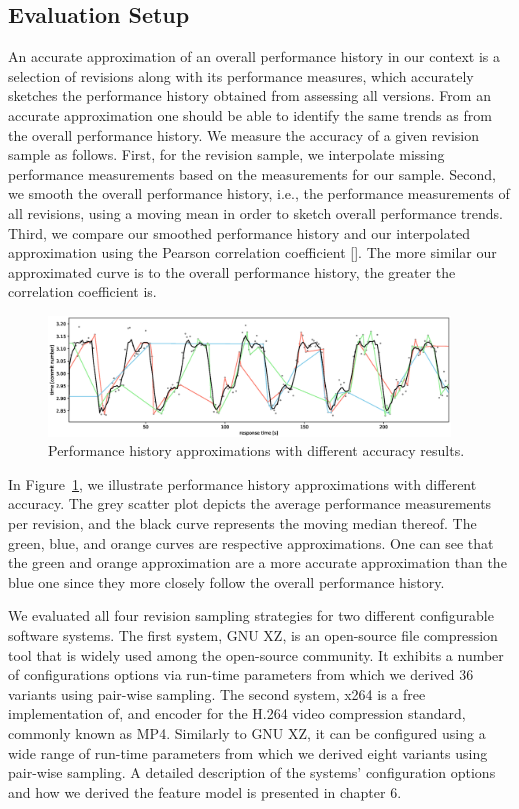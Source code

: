 \subsection{Evaluation Setup}
An accurate approximation of an overall performance
history in our context is a selection of revisions along with its performance measures, which accurately
sketches the performance history obtained from assessing all versions. From an
accurate approximation one should be able to identify the same trends as from
the overall performance history. We measure the accuracy of a given revision
sample as follows. First, for the revision sample, we interpolate missing
performance measurements based on the measurements for our sample. Second, we
smooth the overall performance history, i.e., the performance measurements of
all revisions, using a moving mean in order to sketch overall performance
trends. Third, we compare our smoothed performance history and our interpolated
approximation using the Pearson correlation coefficient []. The more similar
our approximated curve is to the overall performance history, the greater the
correlation coefficient is. 

\begin{figure}[h!]
	\centering
	\includegraphics[width=0.95\textwidth]{images/approximations.eps}
	\caption{Performance history approximations with different accuracy results.}
	\label{fig:approximation_accuracy}
\end{figure}

In Figure~\ref{fig:approximation_accuracy}, we illustrate performance history
approximations with different accuracy. The grey scatter plot depicts the
average performance measurements per revision, and the black curve represents
the moving median thereof. The green, blue, and orange curves are respective
approximations. One can see that the green and orange approximation are a more
accurate approximation than the blue one since they more closely follow the
overall performance history.

We evaluated all four revision sampling strategies
for two different configurable software systems. The first system, GNU XZ, is
an open-source file compression tool that is widely used among the open-source
community. It exhibits a number of configurations options via run-time
parameters from which we derived 36 variants using pair-wise sampling. The
second system, x264 is a free implementation of, and encoder for the H.264
video compression standard, commonly known as MP4. Similarly to GNU XZ, it can
be configured using a wide range of run-time parameters from which we derived
eight variants using pair-wise sampling.  A detailed description of the systems’
configuration options and how we derived the feature model is presented in chapter 6.

